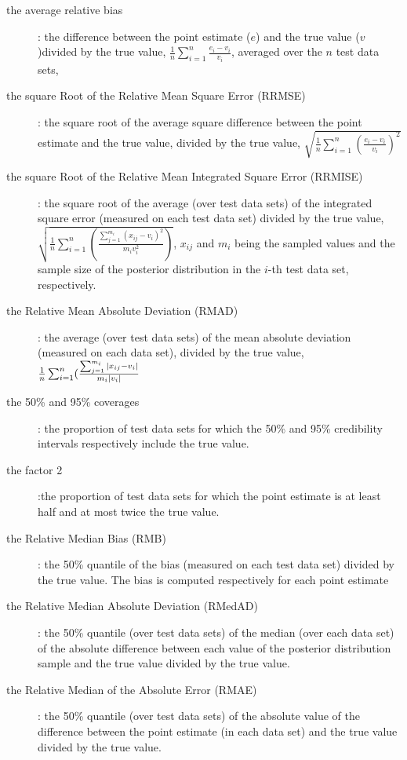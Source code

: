 \begin{description}
\item[the average relative bias] : the difference between the point estimate ($e$) and the true value ($v$)divided by the true value, 
 $\frac{1}{n}\sum_{i=1}^n \frac{e_i - v_i}{v_i}$, averaged over the $n$ test data sets,\\
  \item[the square Root of the Relative Mean Square Error (RRMSE)]: the square root of the average square difference between the point estimate and the true value, divided by the true value,
 $\sqrt{\frac{1}{n}\sum_{i=1}^n(\frac{e_i-v_i}{v_i})^2}$\\
 \item[the square Root of the Relative Mean Integrated Square Error (RRMISE)] : the square root of the average (over test data sets) of the integrated square error (measured on each test data set) divided by the true value,
 $\sqrt{\frac{1}{n}\sum_{i=1}^n(\frac{\sum_{j=1}^{m_i} (x_{ij}-v_i)^2}{m_iv_i^2})}$,
  $x_{ij}$ and $m_i$ being the sampled values and the sample size of the posterior distribution in the $i$-th test data set, respectively.\\
 \item[the Relative Mean Absolute Deviation (RMAD)] : the average (over test data sets) of the mean absolute deviation (measured on each data set), divided by the true value,
 $\frac{1}{n}\sum_{i=1}^n(\frac{\sum_{j=1}^{m_i} \arrowvert x_{ij}-v_i \arrowvert}{m_i \arrowvert v_i\arrowvert}$\\

 \item[the 50\% and 95\% coverages] : the proportion of test data sets for which the 50\% and 95\% credibility intervals respectively include the true value.\\
 \item[the factor 2] :the proportion of test data sets for which the point estimate is at least half and at most twice the true value.
 \item[the Relative Median Bias (RMB)] : the 50\% quantile of the  bias (measured on each test data set) divided by the true value. The bias is computed respectively for each point estimate 
 \item[the Relative Median Absolute Deviation (RMedAD)] : the 50\% quantile (over test data sets) of the median (over each data set) of the absolute difference between each value of the posterior distribution sample and the true value divided by the true value.
 \item[the Relative Median of the Absolute Error (RMAE)] :  the 50\% quantile (over test data sets) of the absolute value of the difference between the point estimate (in each data set) and the true value divided by the true value.
\end{description} 

